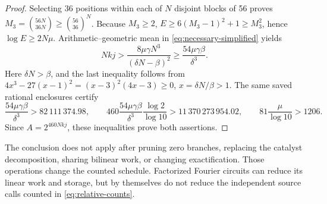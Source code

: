 \begin{proof}
Selecting 36 positions within each of \(N\) disjoint blocks of 56 proves
\(M_3=\binom{56N}{36N}\ge\binom{56}{36}^N\).
Because \(M_3\ge2\),
\(E\ge6(M_3-1)^2+1\ge M_3^2\), hence \(\log E\ge2N\mu\).
Arithmetic--geometric mean in \eqref{eq:necessary-simplified} yields
\[
 Nkj>\frac{8\mu\gamma N^3}{(\delta N-\beta)^2}
       \ge\frac{54\mu\gamma\beta}{\delta^3}.
\]
Here \(\delta N>\beta\), and the last inequality follows from
\(4x^3-27(x-1)^2=(x-3)^2(4x-3)\ge0\), \(x=\delta N/\beta>1\).
The same saved rational enclosures certify
\[
 \frac{54\mu\gamma\beta}{\delta^3}>82\,111\,374.98,
 \qquad
 460\frac{54\mu\gamma\beta}{\delta^3}\frac{\log2}{\log10}
       >11\,370\,273\,954.02,
 \qquad 81\frac\mu{\log10}>1206.
\]
Since \(A=2^{460Nkj}\), these inequalities prove both assertions.
\end{proof}

The conclusion does not apply after pruning zero branches, replacing the
catalyst decomposition, sharing bilinear work, or changing exactification.
Those operations change the counted schedule. Factorized Fourier circuits
can reduce its linear work and storage, but by themselves do not reduce the
independent source calls counted in \eqref{eq:relative-counts}.

